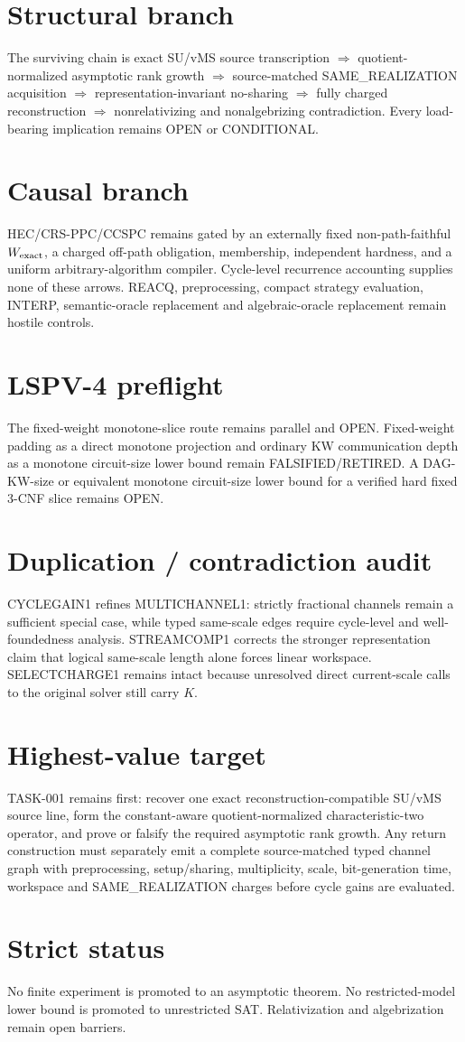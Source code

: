 \documentclass[11pt]{article}
\begin{document}
\section*{Structural branch}
The surviving chain is exact SU/vMS source transcription $\Rightarrow$ quotient-normalized asymptotic rank growth $\Rightarrow$ source-matched SAME\_REALIZATION acquisition $\Rightarrow$ representation-invariant no-sharing $\Rightarrow$ fully charged reconstruction $\Rightarrow$ nonrelativizing and nonalgebrizing contradiction. Every load-bearing implication remains OPEN or CONDITIONAL.
\section*{Causal branch}
HEC/CRS-PPC/CCSPC remains gated by an externally fixed non-path-faithful $W_{\rm exact}$, a charged off-path obligation, membership, independent hardness, and a uniform arbitrary-algorithm compiler. Cycle-level recurrence accounting supplies none of these arrows. REACQ, preprocessing, compact strategy evaluation, INTERP, semantic-oracle replacement and algebraic-oracle replacement remain hostile controls.
\section*{LSPV-4 preflight}
The fixed-weight monotone-slice route remains parallel and OPEN. Fixed-weight padding as a direct monotone projection and ordinary KW communication depth as a monotone circuit-size lower bound remain FALSIFIED/RETIRED. A DAG-KW-size or equivalent monotone circuit-size lower bound for a verified hard fixed 3-CNF slice remains OPEN.
\section*{Duplication / contradiction audit}
CYCLEGAIN1 refines MULTICHANNEL1: strictly fractional channels remain a sufficient special case, while typed same-scale edges require cycle-level and well-foundedness analysis. STREAMCOMP1 corrects the stronger representation claim that logical same-scale length alone forces linear workspace. SELECTCHARGE1 remains intact because unresolved direct current-scale calls to the original solver still carry $K$.
\section*{Highest-value target}
TASK-001 remains first: recover one exact reconstruction-compatible SU/vMS source line, form the constant-aware quotient-normalized characteristic-two operator, and prove or falsify the required asymptotic rank growth. Any return construction must separately emit a complete source-matched typed channel graph with preprocessing, setup/sharing, multiplicity, scale, bit-generation time, workspace and SAME\_REALIZATION charges before cycle gains are evaluated.
\section*{Strict status}
No finite experiment is promoted to an asymptotic theorem. No restricted-model lower bound is promoted to unrestricted SAT. Relativization and algebrization remain open barriers.
\end{document}

